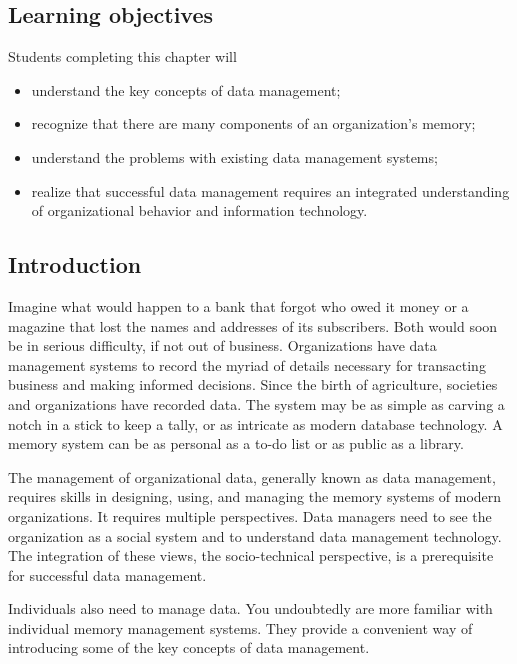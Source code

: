 \documentclass[
]{article}
\begin{document}
\hypertarget{learning-objectives}{%
\subsection*{Learning objectives}\label{learning-objectives}}

Students completing this chapter will

\begin{itemize}
\item
  understand the key concepts of data management;
\item
  recognize that there are many components of an organization's
  memory;
\item
  understand the problems with existing data management systems;
\item
  realize that successful data management requires an integrated
  understanding of organizational behavior and information technology.
\end{itemize}

\hypertarget{introduction}{%
\subsection*{Introduction}\label{introduction}}

Imagine what would happen to a bank that forgot who owed it money or a
magazine that lost the names and addresses of its subscribers. Both
would soon be in serious difficulty, if not out of business.
Organizations have data management systems to record the myriad of
details necessary for transacting business and making informed
decisions. Since the birth of agriculture, societies and organizations
have recorded data. The system may be as simple as carving a notch in a
stick to keep a tally, or as intricate as modern database technology. A
memory system can be as personal as a to-do list or as public as a
library.

The management of organizational data, generally known as data
management, requires skills in designing, using, and managing the memory
systems of modern organizations. It requires multiple perspectives. Data
managers need to see the organization as a social system and to
understand data management technology. The integration of these views,
the socio-technical perspective, is a prerequisite for successful data
management.

Individuals also need to manage data. You undoubtedly are more familiar
with individual memory management systems. They provide a convenient way
of introducing some of the key concepts of data management.
\end{document}
